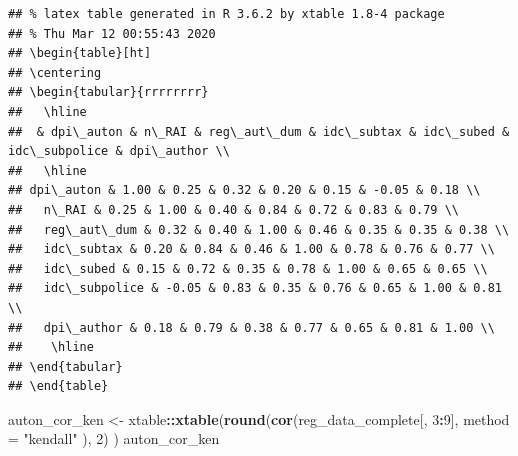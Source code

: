 \documentclass[
]{article}
\newenvironment{Shaded}{\begin{snugshade}}{\end{snugshade}}
\newcommand{\DataTypeTok}[1]{\textcolor[rgb]{0.13,0.29,0.53}{#1}}
\newcommand{\DecValTok}[1]{\textcolor[rgb]{0.00,0.00,0.81}{#1}}
\newcommand{\KeywordTok}[1]{\textcolor[rgb]{0.13,0.29,0.53}{\textbf{#1}}}
\newcommand{\NormalTok}[1]{#1}
\newcommand{\OperatorTok}[1]{\textcolor[rgb]{0.81,0.36,0.00}{\textbf{#1}}}
\newcommand{\StringTok}[1]{\textcolor[rgb]{0.31,0.60,0.02}{#1}}
\begin{document}
\begin{verbatim}
## % latex table generated in R 3.6.2 by xtable 1.8-4 package
## % Thu Mar 12 00:55:43 2020
## \begin{table}[ht]
## \centering
## \begin{tabular}{rrrrrrrr}
##   \hline
##  & dpi\_auton & n\_RAI & reg\_aut\_dum & idc\_subtax & idc\_subed & idc\_subpolice & dpi\_author \\ 
##   \hline
## dpi\_auton & 1.00 & 0.25 & 0.32 & 0.20 & 0.15 & -0.05 & 0.18 \\ 
##   n\_RAI & 0.25 & 1.00 & 0.40 & 0.84 & 0.72 & 0.83 & 0.79 \\ 
##   reg\_aut\_dum & 0.32 & 0.40 & 1.00 & 0.46 & 0.35 & 0.35 & 0.38 \\ 
##   idc\_subtax & 0.20 & 0.84 & 0.46 & 1.00 & 0.78 & 0.76 & 0.77 \\ 
##   idc\_subed & 0.15 & 0.72 & 0.35 & 0.78 & 1.00 & 0.65 & 0.65 \\ 
##   idc\_subpolice & -0.05 & 0.83 & 0.35 & 0.76 & 0.65 & 1.00 & 0.81 \\ 
##   dpi\_author & 0.18 & 0.79 & 0.38 & 0.77 & 0.65 & 0.81 & 1.00 \\ 
##    \hline
## \end{tabular}
## \end{table}
\end{verbatim}

\begin{Shaded}
\begin{Highlighting}[]
\NormalTok{auton_cor_ken <-}\StringTok{ }\NormalTok{xtable}\OperatorTok{::}\KeywordTok{xtable}\NormalTok{(}\KeywordTok{round}\NormalTok{(}\KeywordTok{cor}\NormalTok{(reg_data_complete[, }\DecValTok{3}\OperatorTok{:}\DecValTok{9}\NormalTok{], }
                                          \DataTypeTok{method =} \StringTok{"kendall"}
\NormalTok{                                          ), }\DecValTok{2}\NormalTok{)}
\NormalTok{                                )}
\NormalTok{auton_cor_ken}
\end{Highlighting}
\end{Shaded}
\end{document}
